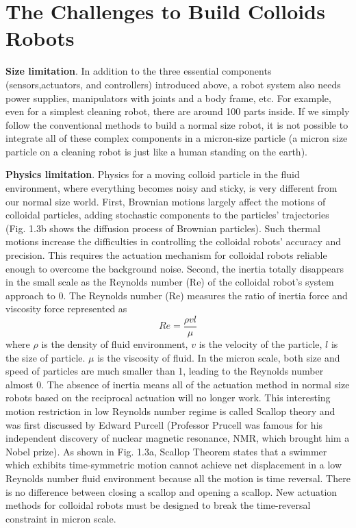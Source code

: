 \section{The Challenges to  Build Colloids Robots}

\textbf{Size limitation}. In addition to the three essential components (sensors,actuators, and controllers) introduced above, a robot system also needs power supplies, manipulators with joints and a body frame, etc. For example,  even for a simplest cleaning robot, there are around 100 parts inside. If we simply follow the conventional methods to build a normal size robot, it is not possible to integrate all of these complex components in a micron-size particle (a micron size particle on a cleaning robot is just like a human standing on the earth).  

\textbf{Physics limitation}. Physics for a moving colloid particle in the fluid environment, where everything becomes noisy and sticky, is very different from our normal size world. First, Brownian motions largely affect the motions of colloidal particles, adding stochastic components to the particles' trajectories (Fig. 1.3b shows the diffusion process of Brownian particles). Such thermal motions increase the difficulties in controlling the colloidal robots' accuracy and precision. This requires the actuation mechanism for colloidal robots reliable enough to overcome the background noise. Second, the inertia totally disappears in the small scale as the Reynolds number (Re) of the colloidal robot's system approach to 0.  The Reynolds number (Re) measures the ratio of inertia force and viscosity force represented as
\begin{equation}
    Re=\frac{\rho v l}{\mu}
\end{equation}
where $\rho $ is the density of fluid environment, $v$ is the velocity of the particle, $l$ is the size of particle. $\mu$ is the  viscosity of fluid. In the micron scale, both size and speed of particles are much smaller than 1, leading to the Reynolds number almost 0. The absence of inertia means all of the actuation method in normal size robots based on the reciprocal actuation will no longer work. This interesting  motion restriction in low Reynolds number regime is called Scallop
theory and was first discussed by Edward Purcell\autocite{purcell1977life} (Professor Prucell was famous for his independent discovery of nuclear magnetic resonance, NMR, which brought him a Nobel prize). As shown in Fig. 1.3a, Scallop Theorem states that a swimmer which exhibits time-symmetric motion cannot achieve net displacement in a low Reynolds number fluid environment because all the motion is time reversal. There is no difference between closing a scallop and opening a scallop. New actuation methods for colloidal robots must be designed to break the time-reversal constraint in micron scale. 

